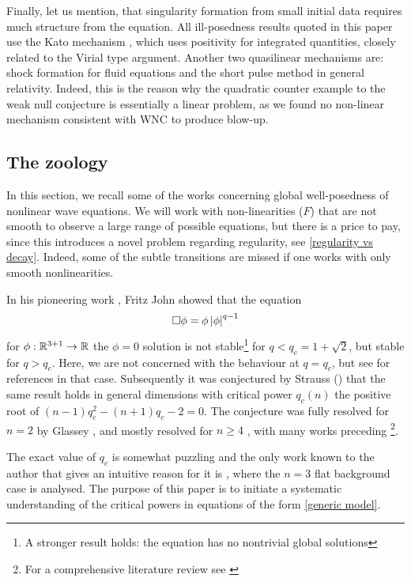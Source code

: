 \documentclass[11pt, oneside]{amsart}
\begin{document}
	Finally, let us mention, that singularity formation from small initial data requires much structure from the equation. All ill-posedness results quoted in this paper use the Kato mechanism \cite{keel_small_1999}, which uses positivity for integrated quantities, closely related to the Virial type argument. Another two quasilinear mechanisms are: shock formation for fluid equations and the short pulse method in general relativity. Indeed, this is the reason why the quadratic counter example to the weak null conjecture is essentially a linear problem, as we found no non-linear mechanism consistent with WNC to produce blow-up.
		
	\subsection{The zoology}\label{zoology}
	In this section, we recall some of the works concerning global well-posedness of nonlinear wave equations. We will work with non-linearities ($F$) that are not smooth to observe a large range of possible equations, but there is a price to pay, since this introduces a novel problem regarding regularity, see \cref{regularity vs decay}. Indeed, some of the subtle transitions are missed if one works with only smooth nonlinearities.
	
	In his pioneering work \cite{john_blow-up_1979}, Fritz John showed that the equation
	\begin{equation}\label{Strauss}
		\begin{gathered}
			\Box\phi=\phi\left\lvert \phi\right\rvert^{q-1}
		\end{gathered}
	\end{equation}
	for $\phi:\mathbb{R}^{3+1}\to\mathbb{R}$ the $\phi=0$ solution is not stable\footnote{A stronger result holds: the equation has no nontrivial global solutions} for $q<q_c=1+\sqrt{2}$, but stable for $q>q_c$. Here, we are not concerned with the behaviour at $q=q_c$, but see \cite{wang_recent_2012} for references in that case. Subsequently it was conjectured by Strauss (\cite{strauss_nonlinear_1981}) that the same result holds in general dimensions with critical power $q_c(n)$ the positive root of $(n-1)q_c^2-(n+1)q_c-2=0$. The conjecture was fully resolved for $n=2$ by Glassey
	\cite{glassey_existence_1981} \cite{glassey_finite-time_1981}, and mostly resolved for $n\geq4$ \cite{georgiev_weighted_1997}, \cite{lindblad_long-time_1996} with many works preceding \footnote{For a comprehensive literature review see \cite{wang_recent_2012}}. 
	
	The exact value of $q_c$ is somewhat puzzling and the only work known to the author that gives an intuitive reason for it is \cite{tao_johns_2007}, where the $n=3$ flat background case is analysed. The purpose of this paper is to initiate a systematic understanding of the critical powers in equations of the form \eqref{generic model}. 
	
\end{document}
